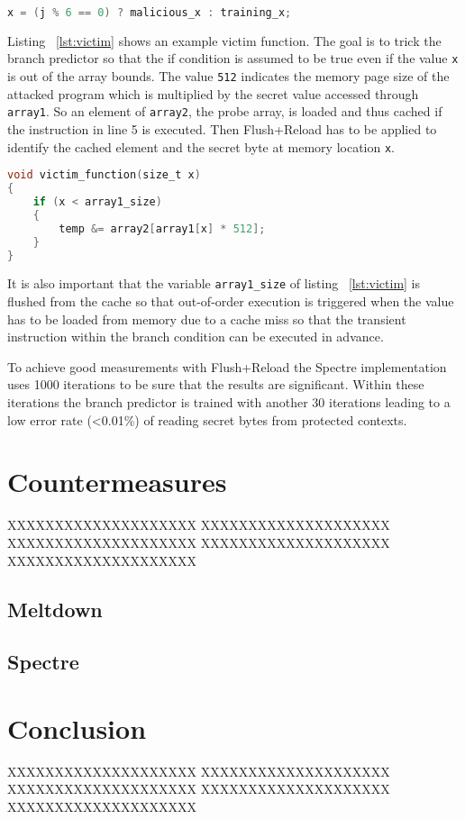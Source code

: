 \documentclass[a4paper,oneside,openright] {scrreprt}
\begin{document}
\begin{lstlisting}[language=C, caption=Spectre: Branch Predictor Tricking Simplified, label={lst:simplified}]
x = (j % 6 == 0) ? malicious_x : training_x;
\end{lstlisting}

Listing ~\ref{lst:victim} shows an example victim function. The goal is to trick the branch predictor so that the if condition is 
assumed to be true even if the value \texttt{x} is out of the array bounds. The value \texttt{512} indicates the memory page size of the
attacked program which is multiplied by the secret value accessed through \texttt{array1}. So an element of \texttt{array2}, the probe array, is loaded
and thus cached if the instruction in line 5 is executed. Then Flush+Reload has to be applied to identify the cached element
and the secret byte at memory location \texttt{x}.

\begin{lstlisting}[language=C, caption=Spectre: Example Victim Gadget, label={lst:victim}]
void victim_function(size_t x)
{
    if (x < array1_size)
    {
        temp &= array2[array1[x] * 512];
    }
}
\end{lstlisting}

It is also important that the variable \texttt{array1\_size} of listing ~\ref{lst:victim} is flushed from the cache so that out-of-order
execution is triggered when the value has to be loaded from memory due to a cache miss so that the transient instruction within
the branch condition can be executed in advance.

To achieve good measurements with Flush+Reload the Spectre implementation uses 1000 iterations to be sure that the results
are significant. Within these iterations the branch predictor is trained with another 30 iterations leading to a low error rate (<0.01\%)
of reading secret bytes from protected contexts.

\chapter{Countermeasures}
\label{ch:countermeasures}

XXXXXXXXXXXXXXXXXXXX
XXXXXXXXXXXXXXXXXXXX
XXXXXXXXXXXXXXXXXXXX
XXXXXXXXXXXXXXXXXXXX
XXXXXXXXXXXXXXXXXXXX

\section{Meltdown}
\label{ch:intro:motivation}

\section{Spectre}
\label{ch:intro:motivation}


\chapter{Conclusion}
\label{ch:conclusion}

XXXXXXXXXXXXXXXXXXXX
XXXXXXXXXXXXXXXXXXXX
XXXXXXXXXXXXXXXXXXXX
XXXXXXXXXXXXXXXXXXXX
XXXXXXXXXXXXXXXXXXXX

\lstlistoflistings



\end{document}
